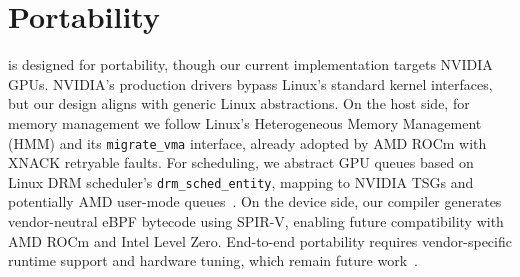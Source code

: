 \section{Portability}
\label{sec:discussion}

\sys is designed for portability, though our current implementation targets NVIDIA GPUs. NVIDIA's production drivers bypass Linux's standard kernel interfaces, but our design aligns with generic Linux abstractions.
On the host side, for memory management we follow Linux's Heterogeneous Memory Management (HMM) and its \texttt{migrate\_vma} interface, already adopted by AMD ROCm with XNACK retryable faults. For scheduling, we abstract GPU queues based on Linux DRM scheduler's \texttt{drm\_sched\_entity}, mapping to NVIDIA TSGs and potentially AMD user-mode queues~\cite{rocm-gpu-memory,linux-gpusvm-doc,drm-gpu-sched,amdgpu-userq-doc}.
On the device side, our compiler generates vendor-neutral eBPF bytecode using SPIR-V, enabling future compatibility with AMD ROCm and Intel Level Zero. End-to-end portability requires vendor-specific runtime support and hardware tuning, which remain future work~\cite{spirv-ir-rfc,llvm-offload-design}.
